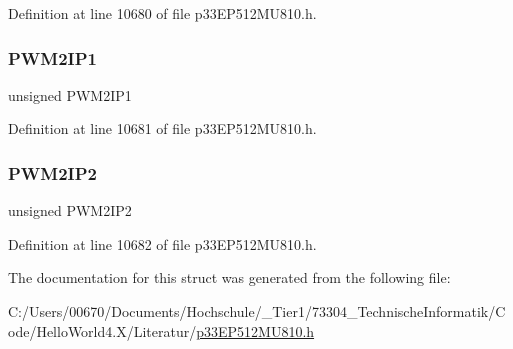 Definition at line 10680 of file p33\+E\+P512\+M\+U810.\+h.

\mbox{\label{structtag_i_p_c23_b_i_t_s_adf1274b1daffd4e654b8ae4a51dbd01f}} 
\subsubsection{\texorpdfstring{P\+W\+M2\+I\+P1}{PWM2IP1}}
{\footnotesize\ttfamily unsigned P\+W\+M2\+I\+P1}



Definition at line 10681 of file p33\+E\+P512\+M\+U810.\+h.

\mbox{\label{structtag_i_p_c23_b_i_t_s_a321e86dd3c70d89049218c7311a0abed}} 
\subsubsection{\texorpdfstring{P\+W\+M2\+I\+P2}{PWM2IP2}}
{\footnotesize\ttfamily unsigned P\+W\+M2\+I\+P2}



Definition at line 10682 of file p33\+E\+P512\+M\+U810.\+h.



The documentation for this struct was generated from the following file\+:\begin{DoxyCompactItemize}
\item 
C\+:/\+Users/00670/\+Documents/\+Hochschule/\+\_\+\+Tier1/73304\+\_\+\+Technische\+Informatik/\+Code/\+Hello\+World4.\+X/\+Literatur/\hyperlink{p33_e_p512_m_u810_8h}{p33\+E\+P512\+M\+U810.\+h}\end{DoxyCompactItemize}
